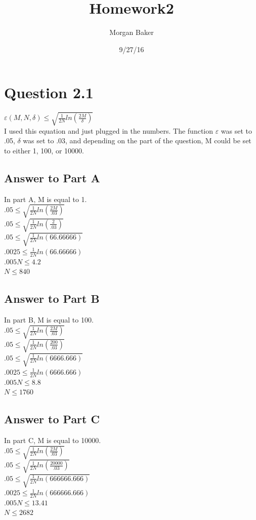 \documentclass[a4paper]{article}
\title{Homework2}
\author{Morgan Baker}
\date{9/27/16}
\begin{document}
\lstset{language=Python}

\maketitle

\section{Question 2.1}
$\varepsilon(M,N,\delta)\leq\sqrt{\frac{1}{2N}ln(\frac{2M}{\delta})}$\\
I used this equation and just plugged in the numbers. The function $\varepsilon$ was set to .05, $\delta$ was set to .03, and depending on the part of the question, M could be set to either 1, 100, or 10000.

\subsection{Answer to Part A}
In part A, M is equal to 1.\\
$.05\leq\sqrt{\frac{1}{2N}ln(\frac{2M}{.03})}$\\
$.05\leq\sqrt{\frac{1}{2N}ln(\frac{2}{.03})}$\\
$.05\leq\sqrt{\frac{1}{2N}ln(66.66666)}$\\
$.0025\leq\frac{1}{2N}ln(66.66666)$\\
$.005N\leq4.2$\\
$N\leq840$

\subsection{Answer to Part B}
In part B, M is equal to 100.\\
$.05\leq\sqrt{\frac{1}{2N}ln(\frac{2M}{.03})}$\\
$.05\leq\sqrt{\frac{1}{2N}ln(\frac{200}{.03})}$\\
$.05\leq\sqrt{\frac{1}{2N}ln(6666.666)}$\\
$.0025\leq\frac{1}{2N}ln(6666.666)$\\
$.005N\leq8.8$\\
$N\leq1760$

\subsection{Answer to Part C}
In part C, M is equal to 10000.\\
$.05\leq\sqrt{\frac{1}{2N}ln(\frac{2M}{.03})}$\\
$.05\leq\sqrt{\frac{1}{2N}ln(\frac{20000}{.03})}$\\
$.05\leq\sqrt{\frac{1}{2N}ln(666666.666)}$\\
$.0025\leq\frac{1}{2N}ln(666666.666)$\\
$.005N\leq13.41$\\
$N\leq2682$
\end{document}
